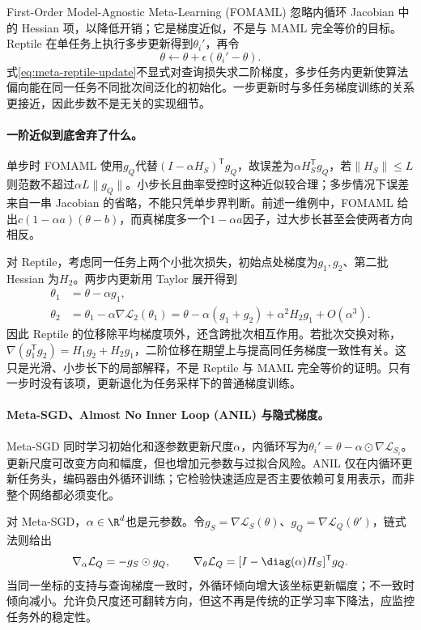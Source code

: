 First-Order Model-Agnostic Meta-Learning (FOMAML) 忽略内循环 Jacobian 中的 Hessian 项，以降低开销；它是梯度近似，不是与 MAML 完全等价的目标。Reptile 在单任务上执行多步更新得到$\theta_i'$，再令\cite{nichol2018reptile}
\begin{equation}
 \theta\leftarrow\theta+\epsilon(\theta_i'-\theta).\label{eq:meta-reptile-update}
\end{equation}
式\eqref{eq:meta-reptile-update}不显式对查询损失求二阶梯度，多步任务内更新使算法偏向能在同一任务不同批次间泛化的初始化。一步更新时与多任务梯度训练的关系更接近，因此步数不是无关的实现细节。

\paragraph{一阶近似到底舍弃了什么。}
单步时 FOMAML 使用$g_Q$代替$(I-\alpha H_S)^{\mathsf T}g_Q$，故误差为$\alpha H_S^{\mathsf T}g_Q$，若$\|H_S\|\leq L$则范数不超过$\alpha L\|g_Q\|$。小步长且曲率受控时这种近似较合理；多步情况下误差来自一串 Jacobian 的省略，不能只凭单步界判断。前述一维例中，FOMAML 给出$c(1-\alpha a)(\theta-b)$，而真梯度多一个$1-\alpha a$因子，过大步长甚至会使两者方向相反。

对 Reptile，考虑同一任务上两个小批次损失，初始点处梯度为$g_1,g_2$、第二批 Hessian 为$H_2$。两步内更新用 Taylor 展开得到
\begin{align}
 \theta_1&=\theta-\alpha g_1,\\
 \theta_2&=\theta_1-\alpha\nabla\mathcal L_2(\theta_1)
 =\theta-\alpha(g_1+g_2)+\alpha^2H_2g_1+O(\alpha^3).
\end{align}
因此 Reptile 的位移除平均梯度项外，还含跨批次相互作用。若批次交换对称，$\nabla(g_1^{\mathsf T}g_2)=H_1g_2+H_2g_1$，二阶位移在期望上与提高同任务梯度一致性有关。这只是光滑、小步长下的局部解释，不是 Reptile 与 MAML 完全等价的证明。只有一步时没有该项，更新退化为任务采样下的普通梯度训练。

\paragraph{Meta-SGD、Almost No Inner Loop (ANIL) 与隐式梯度。}
Meta-SGD 同时学习初始化和逐参数更新尺度$\alpha$，内循环写为$\theta_i'=\theta-\alpha\odot\nabla\mathcal L_{S_i}$\cite{li2017metasgd}。更新尺度可改变方向和幅度，但也增加元参数与过拟合风险。ANIL 仅在内循环更新任务头，编码器由外循环训练\cite{raghu2020anil}；它检验快速适应是否主要依赖可复用表示，而非整个网络都必须变化。

对 Meta-SGD，$\alpha\in\R^d$也是元参数。令$g_S=\nabla\mathcal L_S(\theta)$、$g_Q=\nabla\mathcal L_Q(\theta')$，链式法则给出
\begin{equation}
 \nabla_\alpha\mathcal L_Q=-g_S\odot g_Q,\qquad
 \nabla_\theta\mathcal L_Q=
 [I-\diag(\alpha)H_S]^{\mathsf T}g_Q.
\end{equation}
当同一坐标的支持与查询梯度一致时，外循环倾向增大该坐标更新幅度；不一致时倾向减小。允许负尺度还可翻转方向，但这不再是传统的正学习率下降法，应监控任务外的稳定性。

